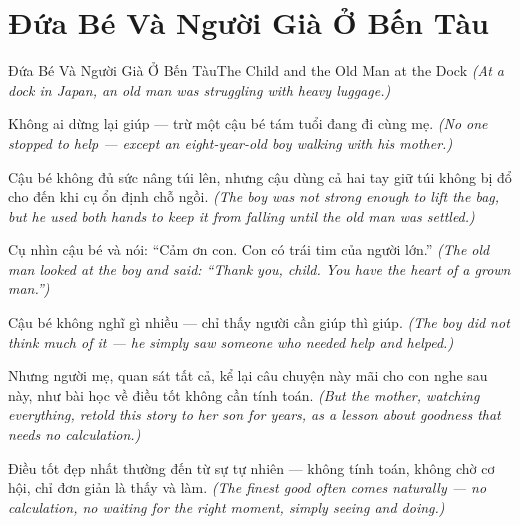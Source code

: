 \section{Đứa Bé Và Người Già Ở Bến Tàu}
\begin{truyen}{Đứa Bé Và Người Già Ở Bến Tàu}{The Child and the Old Man at the Dock}
\textit{(At a dock in Japan, an old man was struggling with heavy luggage.)}

Không ai dừng lại giúp — trừ một cậu bé tám tuổi đang đi cùng mẹ.
\textit{(No one stopped to help — except an eight-year-old boy walking with his mother.)}

Cậu bé không đủ sức nâng túi lên, nhưng cậu dùng cả hai tay giữ túi không bị đổ cho đến khi cụ ổn định chỗ ngồi.
\textit{(The boy was not strong enough to lift the bag, but he used both hands to keep it from falling until the old man was settled.)}

Cụ nhìn cậu bé và nói: ``Cảm ơn con. Con có trái tim của người lớn.''
\textit{(The old man looked at the boy and said: ``Thank you, child. You have the heart of a grown man.'')}

Cậu bé không nghĩ gì nhiều — chỉ thấy người cần giúp thì giúp.
\textit{(The boy did not think much of it — he simply saw someone who needed help and helped.)}

Nhưng người mẹ, quan sát tất cả, kể lại câu chuyện này mãi cho con nghe sau này, như bài học về điều tốt không cần tính toán.
\textit{(But the mother, watching everything, retold this story to her son for years, as a lesson about goodness that needs no calculation.)}

\end{truyen}

\begin{baihoc}
Điều tốt đẹp nhất thường đến từ sự tự nhiên — không tính toán, không chờ cơ hội, chỉ đơn giản là thấy và làm.
\textit{(The finest good often comes naturally — no calculation, no waiting for the right moment, simply seeing and doing.)}
\end{baihoc}
\ngancach

